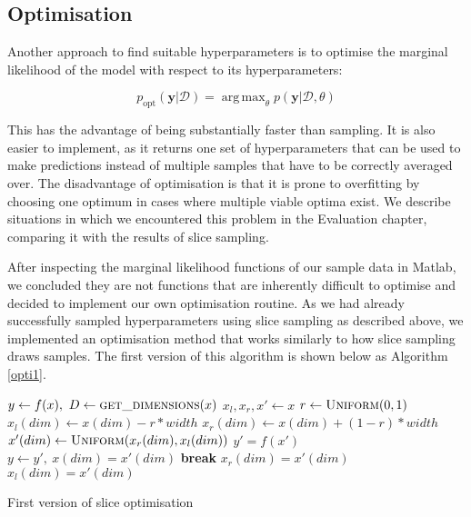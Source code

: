 \documentclass[a4paper,12pt,twoside,openright]{report}
\newcommand{\Break}{\State \textbf{break} }
\DeclareMathOperator*{\argmax}{arg\,max}
\begin{document}
\subsection{Optimisation}
Another approach to find suitable hyperparameters is to optimise the marginal likelihood of the model with respect to its hyperparameters:

\begin{equation}
p_{\text{opt}}(\mathbf{y}|\mathcal{D}) = \argmax_\theta p(\mathbf{y}|\mathcal{D}, \theta)
\end{equation}


This has the advantage of being substantially faster than sampling. It is also easier to implement, as it returns one set of hyperparameters that can be used to make predictions instead of multiple samples that have to be correctly averaged over. The disadvantage of optimisation is that it is prone to overfitting by choosing one optimum in cases where multiple viable optima exist. We describe situations in which we encountered this problem in the Evaluation chapter, comparing it with the results of slice sampling.

After inspecting the marginal likelihood functions of our sample data in Matlab, we concluded they are not functions that are inherently difficult to optimise and decided to implement our own optimisation routine. As we had already successfully sampled hyperparameters using slice sampling as described above, we implemented an optimisation method that works similarly to how slice sampling draws samples. The first version of this algorithm is shown below as Algorithm \ref{opti1}.


\begin{algorithm}
\begin{algorithmic}[1]
\State $y\gets f(x),\ D\gets \Call{get\_dimensions}{x}$
\State $x_l, x_r, x'\gets x$
\State $r\gets \Call{Uniform}{0, 1}$
\State $x_l(dim)\gets x(dim) - r * width$
\State $x_r(dim)\gets x(dim) + (1 - r) * width$
\State $x'(dim)\gets \Call{Uniform}{x_r(dim), x_l(dim)}$
\State $y' = f(x')$
\State $y\gets y',\ x(dim) = x'(dim)$
\Break
\EndIf
{}
\State $x_r(dim) = x'(dim)$
\State $x_l(dim) = x'(dim)$
\EndIf
\EndFor
\EndFor
\EndFor
\EndProcedure
\end{algorithmic}
\caption{First version of slice optimisation}
\label{opti1}
\end{algorithm}
\end{document}
